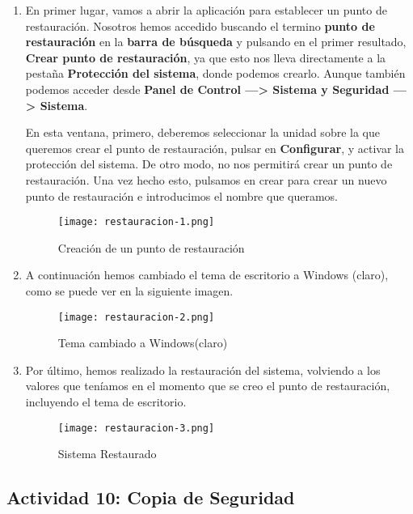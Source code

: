 \begin{enumerate}
    \item En primer lugar, vamos a abrir la aplicación para establecer un punto de restauración. Nosotros hemos accedido buscando el termino \textbf{punto de restauración} en la \textbf{barra de búsqueda} y pulsando en el primer resultado, \textbf{Crear punto de restauración}, ya que esto nos lleva directamente a la pestaña \textbf{Protección del sistema}, donde podemos crearlo. Aunque también podemos acceder desde \textbf{Panel de Control ---> Sistema y Seguridad ---> Sistema}.

    En esta ventana, primero, deberemos seleccionar la unidad sobre la que queremos crear el punto de restauración, pulsar en \textbf{Configurar}, y activar la protección del sistema. De otro modo, no nos permitirá crear un punto de restauración. Una vez hecho esto, pulsamos en crear para crear un nuevo punto de restauración e introducimos el nombre que queramos.

    \begin{figure}[H]
        \centering
        \texttt{[image: restauracion-1.png]}
        \caption{Creación de un punto de restauración}
    \end{figure}

    \item A continuación hemos cambiado el tema de escritorio a Windows (claro), como se puede ver en la siguiente imagen.

    \begin{figure}[H]
        \centering
        \texttt{[image: restauracion-2.png]}
        \caption{Tema cambiado a Windows(claro)}
    \end{figure}

    \item Por último, hemos realizado la restauración del sistema, volviendo a los valores que teníamos en el momento que se creo el punto de restauración, incluyendo el tema de escritorio.

    \begin{figure}[H]
        \centering
        \texttt{[image: restauracion-3.png]}
        \caption{Sistema Restaurado}
    \end{figure}
\end{enumerate}

\subsection{Actividad 10: Copia de Seguridad}
